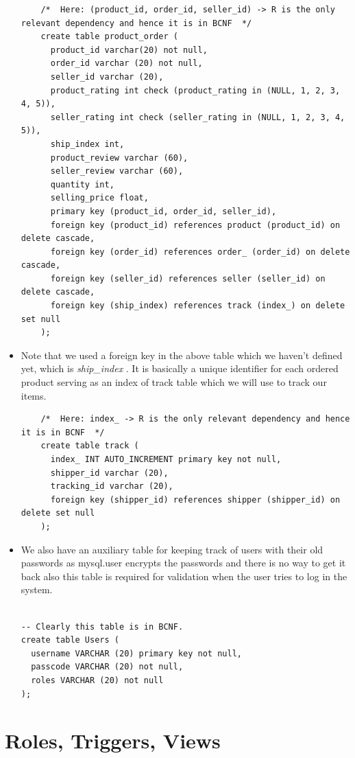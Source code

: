 \documentclass[a4paper,12pt]{article}
\newcommand{\ita}[1]{
    \textit{#1}
}
\begin{document}
\begin{itemize}
\begin{verbatim}
    /*  Here: (product_id, order_id, seller_id) -> R is the only relevant dependency and hence it is in BCNF  */
    create table product_order (
      product_id varchar(20) not null,
      order_id varchar (20) not null,
      seller_id varchar (20),
      product_rating int check (product_rating in (NULL, 1, 2, 3, 4, 5)),
      seller_rating int check (seller_rating in (NULL, 1, 2, 3, 4, 5)),
      ship_index int,
      product_review varchar (60),
      seller_review varchar (60),
      quantity int,
      selling_price float,
      primary key (product_id, order_id, seller_id),
      foreign key (product_id) references product (product_id) on delete cascade,
      foreign key (order_id) references order_ (order_id) on delete cascade,
      foreign key (seller_id) references seller (seller_id) on delete cascade,
      foreign key (ship_index) references track (index_) on delete set null
    );
  \end{verbatim}
  \item Note that we used a foreign key in the above table which we haven't defined yet, which is \ita{ship\_index}. It is basically a unique identifier for each ordered product serving as an index of track table which we will use to track our items.
  \begin{verbatim}
    /*  Here: index_ -> R is the only relevant dependency and hence it is in BCNF  */
    create table track (
      index_ INT AUTO_INCREMENT primary key not null,
      shipper_id varchar (20),
      tracking_id varchar (20),
      foreign key (shipper_id) references shipper (shipper_id) on delete set null
    );
  \end{verbatim}
  \item We also have an auxiliary table for keeping track of users with their old passwords as mysql.user encrypts the passwords and there is no way to get it back also this table is required for validation when the user tries to log in the system.
  \begin{verbatim}

-- Clearly this table is in BCNF.
create table Users (
  username VARCHAR (20) primary key not null,
  passcode VARCHAR (20) not null,
  roles VARCHAR (20) not null
);
  \end{verbatim}
\end{itemize}
\newpage
\section{Roles, Triggers, Views}
\end{document}
